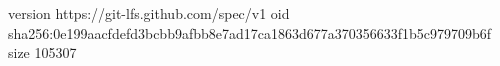 version https://git-lfs.github.com/spec/v1
oid sha256:0e199aacfdefd3bcbb9afbb8e7ad17ca1863d677a370356633f1b5c979709b6f
size 105307

